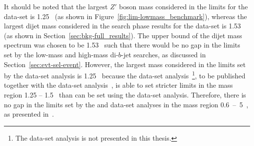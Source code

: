 It should be noted that the largest $Z'$ boson mass considered in the limits for the \lm{} data-set is
1.25~\TeV{} (as shown in Figure~\ref{fig:lim-lowmass_benchmark}),
whereas the largest dijet mass considered in the search phase results
for the \lm{} data-set is 1.53~\TeV{} (as shown in Section~\ref{sec:bkg-full_results}).
The upper bound of the dijet mass spectrum was chosen to be 1.53~\TeV{} such that
there would be no gap in the limits set by the low-mass and high-mass di-$b$-jet searches, as discussed in Section~\ref{sec:evt-sel-event}.
However, the largest mass considered in the limits set by the \lm{} data-set analysis is 1.25~\TeV{}
because the \hm{} data-set analysis~\footnote{ The \hm{} data-set analysis is not presented in this thesis.},
to be published together with the \lm{} data-set analysis~\cite{dibjet-full},
is able to set stricter limits in the mass region 1.25 -- 1.5~\GeV{}
than can be set using the \lm{} data-set analysis.
Therefore, there is no gap in the limits set by the \lm{} and \hm{} data-set analyses in the mass region \mbox{0.6~--~5~\TeV}, as presented in~\cite{dibjet-full}.

